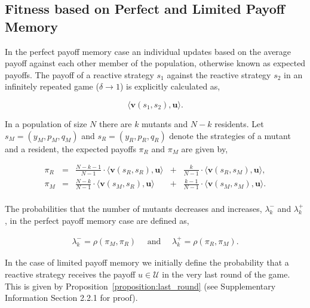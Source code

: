 \documentclass[11pt]{article}
\theoremstyle{plainCl1}
\theoremstyle{plainCl2}
\begin{document}
\subsection{Fitness based on Perfect and Limited Payoff Memory}

In the perfect payoff memory case an individual updates based on the average payoff
against each other member of the population, otherwise known as expected payoffs. 
The payoff of a reactive strategy \(s_1\) against the reactive strategy \(s_2\)
in an infinitely repeated game ($\delta \rightarrow 1$) is explicitly
calculated as,

\[\langle\mathbf{v}(s_1,s_2),\mathbf{u}\rangle.\]

In a population of size \(N\) there are \(k\) mutants and \(N - k\) residents.
Let \(s_M =(y_M, p_M, q_M)\) and \(s_R = (y_R, p_R, q_R)\) denote the
strategies of a mutant and a resident, the expected payoffs \(\pi_R\) and
\(\pi_M\) are given by,

\begin{equation} \label{Eq:ExpPay}
  \begin{array}{lcrcr}
  \displaystyle \pi_R & = &\displaystyle \frac{N\!-\!k\!-\!1}{N-1}\cdot \langle\mathbf{v}(s_R,s_R),\mathbf{u}\rangle	&+	&\displaystyle\frac{k}{N-1}\cdot \langle\mathbf{v}(s_R,s_M),\mathbf{u}\rangle,\\[0.5cm]
  \displaystyle \pi_M & = &\displaystyle\frac{N-k}{N-1}\cdot \langle\mathbf{v}(s_M,s_R),\mathbf{u}\rangle&+	&\displaystyle\frac{k-1}{N-1}\cdot \langle\mathbf{v}(s_M,s_M),\mathbf{u}\rangle.\\
  \end{array}
\end{equation}

The probabilities that the number of mutants decreases and increases,
\(\lambda^-_k\) and \(\lambda^+_k\), in the perfect payoff memory case are
defined as,

\begin{align}\label{eq:perfect_memory_lambdas}
  \lambda^-_k \!=\!\rho(\pi_M, \pi_R) \quad \text{ and } \quad \lambda^+_k \!=\!\rho(\pi_R, \pi_M).
\end{align}

In the case of limited payoff memory we initially define the probability that a
reactive strategy receives the payoff $u\!\in\! \mathcal{U}$ in the very last
round of the game. This is given by Proposition~\ref{proposition:last_round}
(see Supplementary Information Section 2.2.1 for proof).
\end{document}
